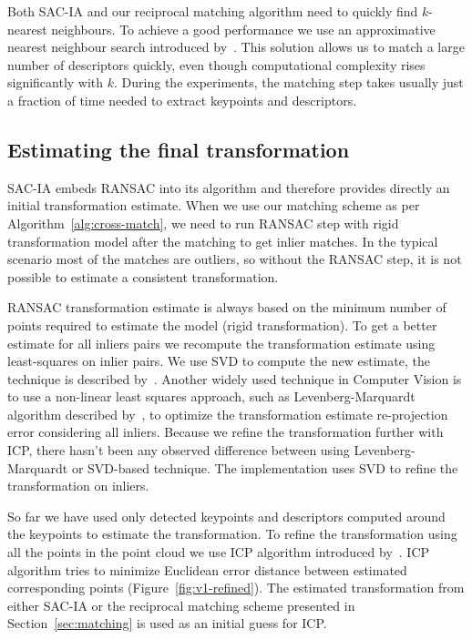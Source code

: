 Both \gls{SAC-IA} and our reciprocal matching algorithm need to quickly find $k$-nearest neighbours. To achieve a good performance we use an approximative nearest neighbour search introduced by~\citet{muja2014flann}. This solution allows us to match a large number of descriptors quickly, even though computational complexity rises significantly with $k$. During the experiments, the matching step takes usually just a fraction of time needed to extract keypoints and descriptors.

\subsection{Estimating the final transformation}
\label{sec:final-estimation}

\gls{SAC-IA} embeds \gls{RANSAC} into its algorithm and therefore provides directly an initial transformation estimate. When we use our matching scheme as per Algorithm~\ref{alg:cross-match}, we need to run \gls{RANSAC} step with rigid transformation model after the matching to get inlier matches. In the typical scenario most of the matches are outliers, so without the \gls{RANSAC} step, it is not possible to estimate a consistent transformation.

\gls{RANSAC} transformation estimate is always based on the minimum number of points required to estimate the model (rigid transformation). To get a better estimate for all inliers pairs we recompute the transformation estimate using least-squares on inlier pairs. We use \gls{SVD} to compute the new estimate, the technique is described by~\citet{golub1970svd}. Another widely used technique in Computer Vision is to use a non-linear least squares approach, such as Levenberg-Marquardt algorithm described by~\citet{more1978levmarq}, to optimize the transformation estimate re-projection error considering all inliers. Because we refine the transformation further with \gls{ICP}, there hasn't been any observed difference between using Levenberg-Marquardt or \gls{SVD}-based technique. The implementation uses \gls{SVD} to refine the transformation on inliers.

So far we have used only detected keypoints and descriptors computed around the keypoints to estimate the transformation. To refine the transformation using all the points in the point cloud we use \gls{ICP} algorithm introduced by~\citet{besl1992icp}. \gls{ICP} algorithm tries to minimize Euclidean error distance between estimated corresponding points (Figure~\ref{fig:v1-refined}). The estimated transformation from either \gls{SAC-IA} or the reciprocal matching scheme presented in Section~\ref{sec:matching} is used as an initial guess for \gls{ICP}.

